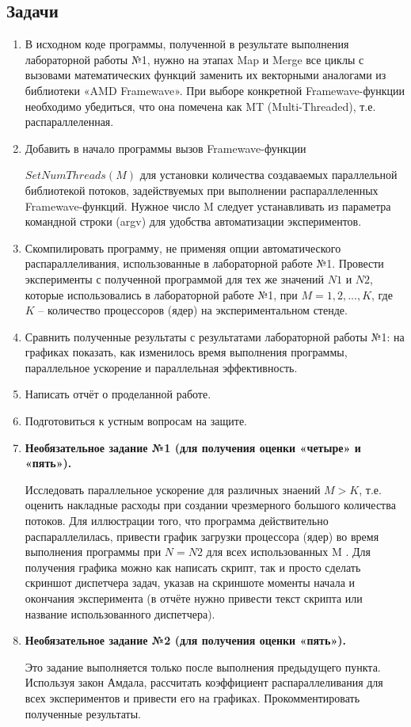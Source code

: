 \documentclass[14pt, a4paper, oneside, final]{extarticle}
\begin{document}
\subsection*{Задачи}
\begin{enumerate}
 \item В исходном коде программы, полученной в результате выполнения
лабораторной работы №1, нужно на этапах Map и Merge все циклы
с вызовами математических функций заменить их векторными аналогами из библиотеки «AMD Framewave». При выборе конкретной Framewave-функции необходимо убедиться, что она помечена как MT (Multi-Threaded),
т.е. распараллеленная.
\item Добавить в начало программы вызов Framewave-функции

 $SetNumThreads(M)$ для установки количества создаваемых параллельной библиотекой потоков, задействуемых при выполнении распараллеленных Framewave-функций. Нужное число M следует устанавливать из параметра командной строки (argv) для удобства автоматизации экспериментов.
 \item Скомпилировать программу, не применяя опции автоматического распараллеливания, использованные в лабораторной работе №1. Провести эксперименты с полученной программой для тех же значений $N1$ и $N2$, которые использовались в лабораторной работе №1, при $M = 1, 2, ..., K$, где $K$ – количество процессоров (ядер) на экспериментальном стенде.
 \item Сравнить полученные результаты с результатами лабораторной работы №1: на графиках показать, как изменилось время выполнения программы, параллельное ускорение и параллельная эффективность.
 \item Написать отчёт о проделанной работе.
 \item Подготовиться к устным вопросам на защите.
 \item \textbf{Необязательное задание №1 (для получения оценки «четыре» и «пять»).}

 Исследовать параллельное ускорение для различных знаений $M > K$, т.е. оценить накладные расходы при создании чрезмерного большого количества потоков. Для иллюстрации того, что программа действительно распараллелилась, привести график загрузки процессора (ядер) во время выполнения программы при $N = N2$ для всех использованных M . Для получения графика можно как написать скрипт, так и просто сделать скриншот диспетчера задач, указав на скриншоте моменты начала и окончания эксперимента (в отчёте нужно привести текст скрипта или название использованного диспетчера).
 \item \textbf{Необязательное задание №2 (для получения оценки «пять»).}

 Это задание выполняется только после выполнения предыдущего пункта.
Используя закон Амдала, рассчитать коэффициент распараллеливания для всех экспериментов и привести его на графиках. Прокомментировать полученные результаты.
\end{enumerate}
\end{document}

